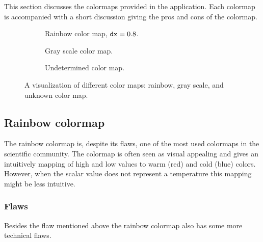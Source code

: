 This section discusses the colormaps provided in the application. Each colormap is accompanied with a short discussion giving the pros and cons of the colormap.
\begin{figure}
	\centering
	\begin{subfigure}{\textwidth}
		\centering
		\caption{Rainbow color map, $\mathtt{dx} = 0.8$.}
		\label{fig:colormapping:intro:differntColorMaps:rainbow}
	\end{subfigure}
	\begin{subfigure}{\textwidth}
		\centering
		\caption{Gray scale color map.}
		\label{fig:colormapping:intro:differntColorMaps:grayscale}
	\end{subfigure}	
	\begin{subfigure}{\textwidth}
		\centering
		\caption{Undetermined color map.}
		\label{fig:colormapping:intro:differntColorMaps:ofChoice}
	\end{subfigure}		
	\caption{A visualization of different color maps:  rainbow,  gray scale, and  unknown color map.}
	\label{fig:colormapping:introduction}
\end{figure}


\subsection{Rainbow colormap} %
\label{ssub:rainbow_colormap}
The rainbow colormap is, despite its flaws, one of the most used colormaps in the scientific community. The colormap is often seen as visual appealing and gives an intuitively mapping of high and low values to warm (red) and cold (blue) colors. However, when the scalar value does not represent a temperature this mapping might be less intuitive.

\subsubsection{Flaws} %
\label{ssub:flaws}
Besides the flaw mentioned above the rainbow colormap also has some more technical flaws.



